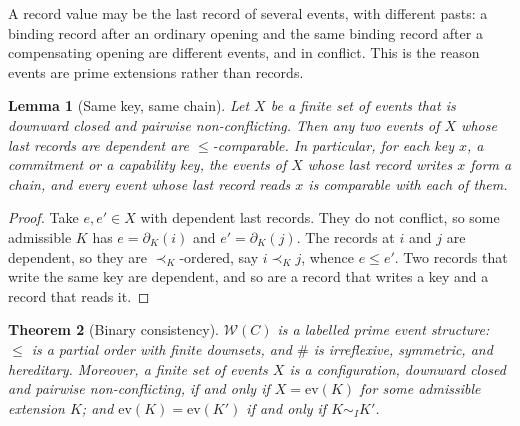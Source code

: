 \documentclass[11pt,openany]{book}
\newtheorem{theorem}{Theorem}[chapter]
\newtheorem{lemma}[theorem]{Lemma}
\theoremstyle{remark}
\begin{document}
A record value may be the last record of several events, with different
pasts: a binding record after an ordinary opening and the same binding
record after a compensating opening are different events, and in
conflict. This is the reason events are prime extensions rather than
records.

\begin{lemma}[Same key, same chain]\label{lem:chain}
Let $X$ be a finite set of events that is downward closed and pairwise
non-conflicting. Then any two events of $X$ whose last records are
dependent are $\le$-comparable. In particular, for each key $x$, a
commitment or a capability key, the events of $X$ whose last record writes
$x$ form a chain, and every event whose last record reads $x$ is comparable
with each of them.
\end{lemma}

\begin{proof}
Take $e,e'\in X$ with dependent last records. They do not conflict, so
some admissible $K$ has $e=\partial_K(i)$ and $e'=\partial_K(j)$. The
records at $i$ and $j$ are dependent, so they are $\prec_K$-ordered, say
$i\prec_K j$, whence $e\le e'$. Two records that write the same key are
dependent, and so are a record that writes a key and a record that reads
it.
\end{proof}

\begin{theorem}[Binary consistency]\label{thm:binary}
$\mathcal W(C)$ is a labelled prime event structure: $\le$ is a partial
order with finite downsets, and $\#$ is irreflexive, symmetric, and
hereditary. Moreover, a finite set of events $X$ is a configuration,
downward closed and pairwise non-conflicting, if and only if
$X=\mathrm{ev}(K)$ for some admissible extension $K$; and
$\mathrm{ev}(K)=\mathrm{ev}(K')$ if and only if $K\sim_I K'$.
\end{theorem}
\end{document}
